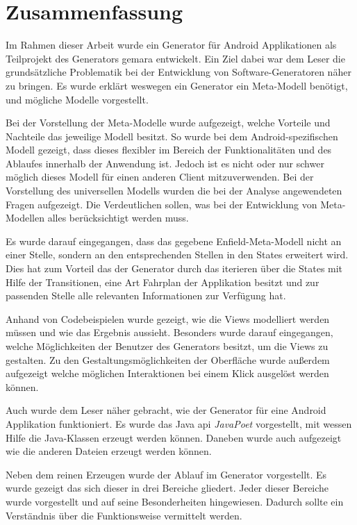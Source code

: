 \chapter{Zusammenfassung}

Im Rahmen dieser Arbeit wurde ein Generator für Android Applikationen als Teilprojekt des Generators \acf{gemara} entwickelt.
Ein Ziel dabei war dem Leser die grundsätzliche Problematik bei der Entwicklung von Software-Generatoren näher zu bringen.
Es wurde erklärt weswegen ein Generator ein Meta-Modell benötigt, und mögliche Modelle vorgestellt. 

Bei der Vorstellung der Meta-Modelle wurde aufgezeigt, welche Vorteile und Nachteile das jeweilige Modell besitzt. So wurde bei dem Android-spezifischen Modell gezeigt, dass dieses flexibler im Bereich der Funktionalitäten und des Ablaufes innerhalb der Anwendung ist. Jedoch ist es nicht oder nur schwer möglich dieses Modell für einen anderen Client mitzuverwenden. Bei der Vorstellung des universellen Modells wurden die bei der Analyse angewendeten Fragen aufgezeigt. Die Verdeutlichen sollen, was bei der Entwicklung von Meta-Modellen alles berücksichtigt werden muss.

Es wurde darauf eingegangen, dass das gegebene Enfield-Meta-Modell nicht an einer Stelle, sondern an den entsprechenden Stellen in den States erweitert wird. Dies hat zum Vorteil das der Generator durch das iterieren über die States mit Hilfe der Transitionen, eine Art Fahrplan der Applikation besitzt und zur passenden Stelle alle relevanten Informationen zur Verfügung hat.

Anhand von Codebeispielen wurde gezeigt, wie die Views modelliert werden müssen und wie das Ergebnis aussieht. Besonders wurde darauf eingegangen, welche Möglichkeiten der Benutzer des Generators besitzt, um die Views zu gestalten. Zu den Gestaltungsmöglichkeiten der Oberfläche wurde außerdem aufgezeigt welche möglichen Interaktionen bei einem Klick ausgelöst werden können.

Auch wurde dem Leser näher gebracht, wie der Generator für eine Android Applikation funktioniert. Es wurde das Java \acf{api} \textit{JavaPoet} vorgestellt, mit wessen Hilfe die Java-Klassen erzeugt werden können. Daneben wurde auch aufgezeigt wie die anderen Dateien erzeugt werden können. 

Neben dem reinen Erzeugen wurde der Ablauf im Generator vorgestellt. Es wurde gezeigt das sich dieser in drei Bereiche gliedert.
Jeder dieser Bereiche wurde vorgestellt und auf seine Besonderheiten hingewiesen. Dadurch sollte ein Verständnis über die Funktionsweise vermittelt werden.  

